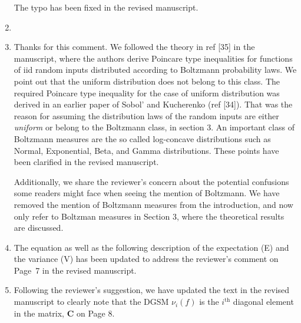 \documentclass[11pt,final]{article}
\newcommand{\referee}[1]{\vspace{.1ex}\noindent{\textcolor{blue}{#1}}}
\begin{document}
\begin{enumerate}[wide, labelwidth=!, labelindent=0pt]
\noindent  The typo has been fixed in the revised manuscript. 

\item \referee{7.23-27: why 'statistical independence' and not just 'independence'? Is there any other 
type of independence?}

\item \referee{7.29-30: Any PDF can be written in a Boltzmann form, V(x) is just the negative log-PDF, 
I am not sure if it is necessary to bring up a Boltzmann distribution language here.
Also, it could be confused with Maxwell-Boltzmann distribution, which is a very specific PDF form.}
Thanks for this comment. We followed the theory in ref [35] 
in the manuscript, where the authors derive Poincare type 
inequalities for functions of iid random
inputs distributed according to Boltzmann probability laws. 
We point out that the uniform distribution does not belong to this class. 
The required Poincare type inequality for the case of uniform 
distribution was derived in an earlier paper of Sobol' and Kucherenko (ref [34]). 
That
was the reason for assuming the distribution laws of the random inputs are
either \emph{uniform} or belong to the Boltzmann class, in section 3. An
important class of Boltzmann measures are the so called log-concave
distributions such as Normal, Exponential, Beta, and Gamma distributions. These
points have been clarified in the revised manuscript. 

Additionally, we share the reviewer's concern about the potential confusions some readers
might face when seeing the mention of Boltzmann. We have removed the mention of
Boltzmann measures from the introduction, and now only refer to Boltzman
measures in Section
3, where the theoretical results are discussed. 
 

\item \referee{7.40: Explain what E and V are with respect to in Eq (8).}

\noindent  The equation as well as the following description of the expectation (E) and the variance (V)
has been updated to address the reviewer's comment on Page~7 in the revised manuscript. 

\item \referee{7.50: Just say in words that it is the i-th diagonal element of matrix C.}

\noindent Following the reviewer's suggestion, we have updated the text in the revised manuscript to
clearly note that the DGSM $\nu_i(f)$ is the $i^{\text{th}}$ diagonal element in the matrix, $\mathbf{C}$
on Page 8.


\end{enumerate}
\end{document}

